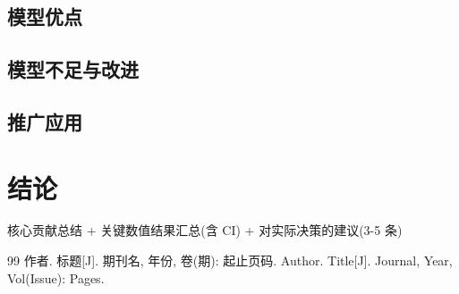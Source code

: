 \documentclass[12pt,a4paper]{ctexart}
\begin{document}
\subsection{模型优点}  %
\subsection{模型不足与改进}
\subsection{推广应用}  %

\section{结论}
核心贡献总结 + 关键数值结果汇总(含 CI) + 对实际决策的建议(3-5 条)
\label{lastmain}  %

\begin{thebibliography}{99}
 作者. 标题[J]. 期刊名, 年份, 卷(期): 起止页码.
 Author. Title[J]. Journal, Year, Vol(Issue): Pages.
\end{thebibliography}
\newpage  %
\appendix  %
\end{document}

